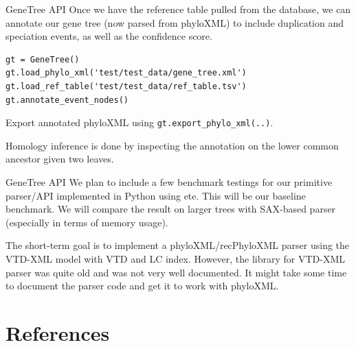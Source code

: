 \documentclass{beamer}
\begin{document}
\begin{frame}[fragile]{GeneTree API}
    Once we have the reference table pulled from the database, we can annotate our gene tree (now parsed from phyloXML) to include duplication and speciation events, as well as the confidence score.

    \hfill

    \begin{lstlisting}
gt = GeneTree()
gt.load_phylo_xml('test/test_data/gene_tree.xml')
gt.load_ref_table('test/test_data/ref_table.tsv')
gt.annotate_event_nodes()
    \end{lstlisting}

    Export annotated phyloXML using \texttt{gt.export\_phylo\_xml(..)}.

    Homology inference is done by inspecting the annotation on the lower common ancestor given two leaves.
\end{frame}

\begin{frame}{GeneTree API}
    We plan to include a few benchmark testings for our primitive parser/API implemented in Python using ete. This will be our baseline benchmark. We will compare the result on larger trees with SAX-based parser (especially in terms of memory usage).

    The short-term goal is to implement a phyloXML/recPhyloXML parser using the VTD-XML model with VTD and LC index. However, the library for VTD-XML parser was quite old and was not very well documented. It might take some time to document the parser code and get it to work with phyloXML.
\end{frame}

\section{References}
\end{document}
